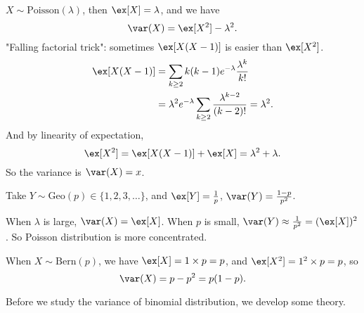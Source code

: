 \begin{example}
    \(X \sim \mathrm{Poisson}(\lambda)\), then \(\ex[X] = \lambda\), and we have
    \[
        \var(X) = \ex[X^2] - \lambda^2.
    \]
    "Falling factorial trick": sometimes \(\ex[X(X-1)]\) is easier than \(\ex[X^2]\).
    \begin{align*}
        \ex[X(X-1)] &= \sum_{k\geq 2} k(k-1)e^{-\lambda}\frac{\lambda^k}{k!}\\
        &= \lambda^2 e^{-\lambda} \sum_{k \geq 2} \frac{\lambda^{k - 2}}{(k-2)!} = \lambda^2.
    \end{align*}
    And by linearity of expectation,
    \[
        \ex[X^2] = \ex[X(X-1)] + \ex[X] = \lambda^2 + \lambda.
    \]
    So the variance is \(\var(X) = x\).
\end{example}
\begin{example}
    Take \(Y \sim \mathrm{Geo}(p) \in \{1, 2, 3, \dots\}\), and \(\ex[Y] = \frac{1}{p}\), \(\var(Y) = \frac{1-p}{p^2}\).
\end{example}
\begin{note}
    When \(\lambda\) is large, \(\var(X) = \ex[X]\). When \(p\) is small, \(\var(Y) \approx \frac{1}{p^2} = (\ex[X])^2\). So Poisson distribution is more concentrated.
\end{note}
\begin{example}
    When \(X \sim \mathrm{Bern}(p)\), we have \(\ex[X] = 1 \times p = p\), and \(\ex[X^2] = 1^2 \times p = p\), so
    \[
        \var(X) = p - p^2 = p(1-p).
    \]
\end{example}

Before we study the variance of binomial distribution, we develop some theory.

